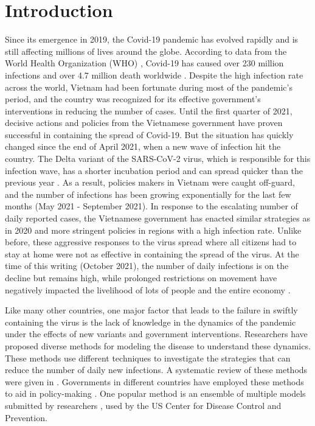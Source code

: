 \chapter{Introduction}
\label{chap:introduction}

Since its emergence in 2019, the Covid-19 pandemic has evolved rapidly and is still affecting millions of lives around the globe.
According to data from the World Health Organization (WHO) \cite{WHOCoronavirusCOVID19}, Covid-19 has caused over 230 million infections and over 4.7 million death worldwide .
Despite the high infection rate across the world, Vietnam had been fortunate during most of the pandemic's period, and the country was recognized for its effective government's interventions in reducing the number of cases.
Until the first quarter of 2021, decisive actions and policies from the Vietnamese government have proven successful in containing the spread of Covid-19.
But the situation has quickly changed since the end of April 2021, when a new wave of infection hit the country.
The Delta variant of the SARS-CoV-2 virus, which is responsible for this infection wave, has a shorter incubation period and can spread quicker than the previous year \cite{mahaseDeltaVariantWhat2021}.
As a result, policies makers in Vietnam were caught off-guard, and the number of infections has been growing exponentially for the last few months (May 2021 - September 2021).
In response to the escalating number of daily reported cases, the Vietnamese government has enacted similar strategies as in 2020 and more stringent policies in regions with a high infection rate.
Unlike before, these aggressive responses to the virus spread where all citizens had to stay at home were not as effective in containing the spread of the virus.
At the time of this writing (October 2021), the number of daily infections is on the decline but remains high, while prolonged restrictions on movement have negatively impacted the livelihood of lots of people and the entire economy \cite{RapidAssessmentDesign}.

Like many other countries, one major factor that leads to the failure in swiftly containing the virus is the lack of knowledge in the dynamics of the pandemic under the effects of new variants and government interventions.
Researchers have proposed diverse methods for modeling the disease to understand these dynamics.
These methods use different techniques to investigate the strategies that can reduce the number of daily new infections.
A systematic review of these methods were given in \cite{rahimiReviewCOVID19Forecasting2021}.
Governments in different countries have employed these methods to aid in policy-making \cite{adamSpecialReportSimulations2020}.
One popular method is an ensemble of multiple models submitted by researchers \cite{rayEnsembleForecastsCoronavirus2020}, used by the \gls{US} Center for Disease Control and Prevention.

